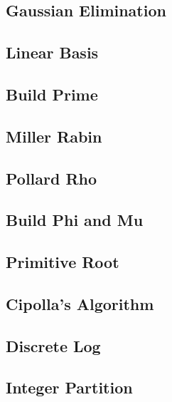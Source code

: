 \documentclass[a4paper,10pt,twocolumn,oneside]{article}
\begin{document}
\subsection{Gaussian Elimination}


\subsection{Linear Basis}


\subsection{Build Prime}


\subsection{Miller Rabin}


\subsection{Pollard Rho}


\subsection{Build Phi and Mu}


\subsection{Primitive Root}


\subsection{Cipolla's Algorithm}


\subsection{Discrete Log}


\subsection{Integer Partition}

\end{document}
